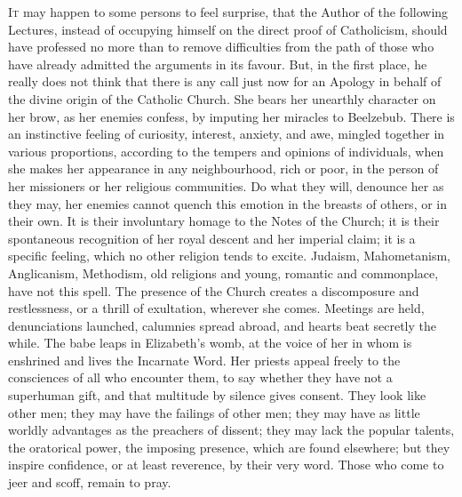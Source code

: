 I\textsc{t} may happen to some persons to feel surprise, that the Author of
the following Lectures, instead of occupying himself on the direct
proof of Catholicism, should have professed no more than to remove
difficulties from the path of those who have already admitted the
arguments in its favour. But, in the first place, he really does not
think that there is any call just now for an Apology in behalf of the
divine origin of the Catholic Church. She bears her unearthly
character on her brow, as her enemies confess, by imputing her
miracles to Beelzebub. There is an instinctive feeling of curiosity,
interest, anxiety, and awe, mingled together in various proportions,
according to the tempers and opinions of individuals, when she makes
her appearance in any neighbourhood, rich or poor, in the person of
her missioners or her religious communities. Do what they will,
denounce her as they may, her enemies cannot quench this emotion in
the breasts of others, or in their own. It is their involuntary homage
to the Notes of the Church; it is their spontaneous recognition of her
royal descent and her imperial claim; it is a specific feeling, which
no other religion tends to excite. Judaism, Mahometanism, Anglicanism,
Methodism, old religions and young, romantic and commonplace, have not
this spell. The presence of the Church creates a discomposure and
restlessness, or a thrill of exultation, wherever she comes. Meetings
are held, denunciations launched, calumnies spread abroad, and hearts
beat secretly the while. The babe leaps in Elizabeth's womb, at the
voice of her in whom is enshrined and lives the Incarnate Word. Her
priests appeal freely to the consciences of all who encounter them, to
say whether they have not a superhuman gift, and that multitude by
silence gives consent. They look like other men; they may have the
failings of other men; they may have as little worldly advantages as
the preachers of dissent; they may lack the popular talents, the
oratorical power, the imposing presence, which are found elsewhere;
but they inspire confidence, or at least reverence, by their very
word. Those who come to jeer and scoff, remain to pray.


